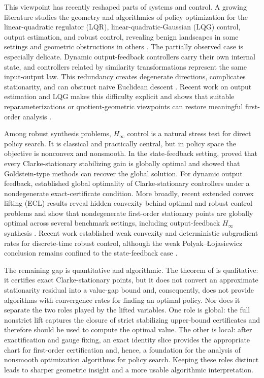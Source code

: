 \documentclass[letterpaper,10pt,conference]{ieeeconf}
\renewcommand{\^}[1]{^{(#1)}}
\begin{document}
This viewpoint has recently reshaped parts of systems and control. A growing literature studies the geometry and algorithmics of policy optimization for the linear-quadratic regulator (LQR), linear-quadratic-Gaussian (LQG) control, output estimation, and robust control, revealing benign landscapes in some settings and geometric obstructions in others \citep{fazel2018global,zhang2021policy,umenberger2022globally,zheng2025extended}. The partially observed case is especially delicate. Dynamic output-feedback controllers carry their own internal state, and controllers related by similarity transformations represent the same input-output law. This redundancy creates degenerate directions, complicates stationarity, and can obstruct naive Euclidean descent \citep{hu2022connectivity,kraisler2024output}. Recent work on output estimation and LQG makes this difficulty explicit and shows that suitable reparameterizations or quotient-geometric viewpoints can restore meaningful first-order analysis \citep{umenberger2022globally,kraisler2024output}.

Among robust synthesis problems, $H_\infty$ control is a natural stress test for direct policy search. It is classical and practically central, but in policy space the objective is nonconvex and nonsmooth. In the state-feedback setting, \citet{guo2022global} proved that every Clarke-stationary stabilizing gain is globally optimal and showed that Goldstein-type methods can recover the global solution. For dynamic output feedback, \citet{tang2023global} established global optimality of Clarke-stationary controllers under a nondegenerate exact-certificate condition. More broadly, recent extended convex lifting (ECL) results reveal hidden convexity behind optimal and robust control problems and show that nondegenerate first-order stationary points are globally optimal across several benchmark settings, including output-feedback $H_\infty$ synthesis \citep{zheng2026benign,zheng2025extended}. Recent work  established weak convexity and deterministic subgradient rates for discrete-time robust control, although the weak Polyak--\L{}ojasiewicz conclusion remains confined to the state-feedback case \citep{watanabe2025policy}.

The remaining gap is quantitative and algorithmic. The theorem of \citet{tang2023global} is qualitative: it certifies exact Clarke-stationary points, but it does not convert an approximate stationarity residual into a value-gap bound and, consequently, does not provide algorithms with convergence rates for finding an optimal policy. Nor does it separate the two roles played by the lifted variables. One role is global: the full nonstrict lift captures the closure of strict stabilizing upper-bound certificates and therefore should be used to compute the optimal value. The other is local: after exactification and gauge fixing, an exact identity slice provides the appropriate chart for first-order certification and, hence, a foundation for the analysis of nonsmooth optimization algorithms for policy search. Keeping these roles distinct leads to sharper geometric insight and a more usable algorithmic interpretation.
\end{document}
